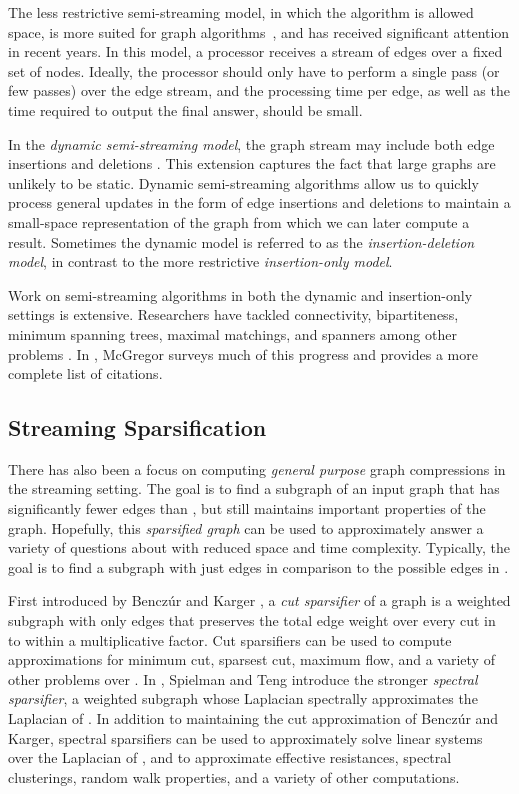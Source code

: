 \documentclass[11pt]{article}
\begin{document}
The less restrictive semi-streaming model, in which the
algorithm is allowed  space, is more suited for graph
algorithms~\cite{feigenbaum2005graph}, and has received significant attention in recent years. In this model, a processor receives a stream of edges over a fixed set of  nodes.  Ideally, the processor should only have to perform a single pass (or few passes) over the edge stream, and the processing time per edge, as well as the time required to output the final answer, should be small.

In the \emph{dynamic semi-streaming model}, the graph stream may include both edge insertions and deletions \cite{linearMeasurement}. This extension captures the fact that large graphs are unlikely to be static. Dynamic semi-streaming algorithms allow us to quickly process general updates in the form of edge insertions and deletions to maintain a small-space representation of the graph from which we can later compute a result. Sometimes the dynamic model is referred to as the \emph{insertion-deletion model}, in contrast to the more restrictive \emph{insertion-only model}.

Work on semi-streaming algorithms in both the dynamic and insertion-only settings is extensive. Researchers have tackled connectivity, bipartiteness, minimum spanning trees, maximal matchings, and spanners among other problems \cite{feigenbaum2005graph, epstein2011improved, elkin2011streaming, linearMeasurement,gssss}. In \cite{gregorSurvey},  McGregor surveys much of this progress and provides a more complete list of citations.

\subsection{Streaming Sparsification}
There has also been a focus on computing \emph{general purpose} graph compressions in the streaming setting. The goal is to find a subgraph of an input graph  that has significantly fewer edges than , but still maintains important properties of the graph. Hopefully, this \emph{sparsified graph} can be used to approximately answer a variety of questions about  with reduced space and time complexity. Typically, the goal is to find a subgraph with just  edges in comparison to the possible  edges in . 

First introduced by Bencz{\'u}r and Karger \cite{benczur1996approximating}, a \emph{cut sparsifier} of a graph  is a weighted subgraph with only  edges that preserves the total edge weight over every cut in  to within a  multiplicative factor. Cut sparsifiers can be used to compute approximations for minimum cut, sparsest cut, maximum flow, and a variety of other problems over . In \cite{spielmanTengSpectralSparse}, Spielman and Teng introduce the stronger \emph{spectral sparsifier}, a weighted subgraph whose Laplacian spectrally approximates the Laplacian of . In addition to maintaining the cut approximation of Bencz{\'u}r and Karger, spectral sparsifiers can be used to approximately solve linear systems over the Laplacian of , and to approximate effective resistances, spectral clusterings, random walk properties, and a variety of other computations. 
\end{document}
